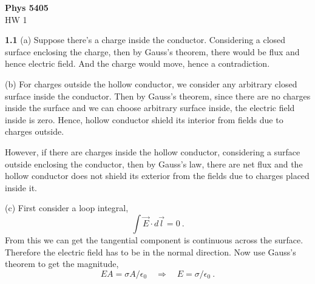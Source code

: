 \documentclass[12pt]{article}
\begin{document}
\begin{center}
{\bf Phys 5405}\\
HW 1
\end{center}
\textbf{1.1} (a) Suppose there's a charge inside the conductor. Considering a closed surface enclosing the charge, then by Gauss's theorem, there would be flux and hence electric field. And the charge would move, hence a contradiction.

\bigskip
\noindent(b) For charges outside the hollow conductor, we consider any arbitrary closed surface inside the conductor. Then by Gauss's theorem, since there are no charges inside the surface and we can choose arbitrary surface inside, the electric field inside is zero. Hence, hollow conductor shield its interior from fields due to charges outside.

However, if there are charges inside the hollow conductor, considering a surface outside enclosing the conductor, then by Gauss's law, there are net flux and the hollow conductor does not shield its exterior from the fields due to charges placed inside it.

\bigskip
\noindent(c) First consider a loop integral,
$$
\int \vec{E}\cdot d\vec{l} = 0~.
$$
From this we can get the tangential component is continuous across the surface. Therefore the electric field has to be in the normal direction. Now use Gauss's theorem to get the magnitude,
$$
E A = \sigma A /\epsilon_0 \quad \Rightarrow \quad E = \sigma/\epsilon_0~.
$$
\end{document}
